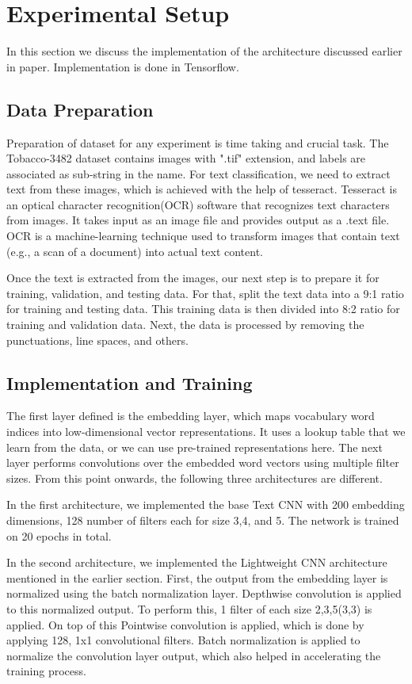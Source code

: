 \documentclass[conference]{IEEEtran}
\begin{document}
\section{Experimental Setup}
In this section we discuss the implementation of the architecture discussed earlier in paper. Implementation is done in Tensorflow.

\subsection{Data Preparation}\label{AA}
Preparation of dataset for any experiment is time taking and crucial task. The Tobacco-3482 dataset contains images with ".tif" extension, and labels are associated as sub-string in the name. For text classification, we need to extract text from these images, which is achieved with the help of tesseract. Tesseract is an optical character recognition(OCR) software that recognizes text characters from images. It takes input as an image file and provides output as a .text file. OCR is a machine-learning technique used to transform images that contain text (e.g., a scan of a document) into actual text content.

Once the text is extracted from the images, our next step is to prepare it for training, validation, and testing data. For that, split the text data into a 9:1 ratio for training and testing data. This training data is then divided into 8:2 ratio for training and validation data. Next, the data is processed by removing the punctuations, line spaces, and others.


\subsection{Implementation and Training }\label{AA}
The first layer defined is the embedding layer, which maps vocabulary word indices into low-dimensional vector representations. It uses a lookup table that we learn from the data, or we can use pre-trained representations here. The next layer performs convolutions over the embedded word vectors using multiple filter sizes. From this point onwards, the following three architectures are different.

In the first architecture, we implemented the base Text CNN with 200 embedding dimensions, 128 number of filters each for size 3,4, and 5. The network is trained on 20 epochs in total.

In the second architecture, we implemented the Lightweight CNN architecture mentioned in the earlier section. First, the output from the embedding layer is normalized using the batch normalization layer. Depthwise convolution is applied to this normalized output. To perform this, 1 filter of each size 2,3,5(3,3) is applied. On top of this Pointwise convolution is applied, which is done by applying 128, 1x1 convolutional filters. Batch normalization is applied to normalize the convolution layer output, which also helped in accelerating the training process.
\end{document}
